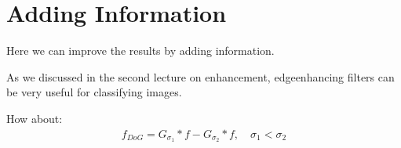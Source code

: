 \documentclass[letterpaper,10pt,english]{sphinxmanual}
\begin{document}
\noindent{}


\chapter{Adding Information}
\label{\detokenize{05-AdvancedSegmentation:adding-information}}
\sphinxAtStartPar
Here we can improve the results by adding information.

\sphinxAtStartPar
As we discussed in the second lecture on enhancement, edge\sphinxhyphen{}enhancing filters can be very useful for classifying images.

\sphinxAtStartPar
How about:
\begin{equation*}
\begin{split}f_{DoG}= G_{\sigma_1}*f - G_{\sigma_2}*f,\quad \sigma_1<\sigma_2\end{split}
\end{equation*}
\end{document}
